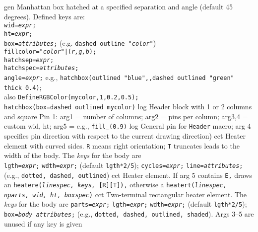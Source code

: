 %

%
  {gen}%
  {Manhattan box hatched at a specified separation
    and angle (default 45 degrees).
   Defined keys are:\\
    {\tt wid={\sl expr};}\\
    {\tt ht={\sl expr};}\\
    {\tt box={\sl attributes};} (e.g. {\tt dashed outline "{\sl color}"})\\
    {\tt fillcolor="{\sl color}"|({\sl r,g,b});}\\
    {\tt hatchsep={\sl expr};}\\
    {\tt hatchspec={\sl attributes};}\\
    {\tt angle={\sl expr};}
 e.g.,
   {\tt hatchbox(outlined "blue",{},dashed outlined "green" thick 0.4)};\\
   also
   {\tt DefineRGBColor(mycolor,1,0.2,0.5);\\
        hatchbox(box=dashed outlined mycolor)}}%
%
  {log}%
  {Header block with 1 or 2 columns and square Pin 1:
   arg1 = number of columns;
   arg2 = pins per column;
   arg3,4 = custom wid, ht;
   arg5 = e.g., {\tt fill\_(0.9)}%
    }%
%
  {log}%
  {General pin for {\tt Header} macro; arg 4 specifies pin direction
   with respect to the current drawing direction)}%
%
  {cct}%
  {Heater element with curved sides.
    {\tt R} means right orientation;
    {\tt T} truncates leads to the width of the body.
    The {\sl keys} for the body are\\
    {\tt lgth={\sl expr};}
    {\tt wdth={\sl expr};} (default {\tt lgth*2/5});
    {\tt cycles={\sl expr};}%
    {\tt line={\sl attributes};} (e.g., {\tt dotted, dashed, outlined})}%
%
  {cct}%
  {Heater element. If arg 5 contains {\tt E,}
    draws an {\tt heatere({\sl linespec, keys,} [R][T]),}
    otherwise a
    {\tt heatert({\sl linespec, nparts, wid, ht, boxspec})}}%
%
  {cct}%
  {Two-terminal rectangular heater element.
    The {\sl keys} for the body are
    {\tt parts={\sl expr};}
    {\tt lgth={\sl expr};}
    {\tt wdth={\sl expr};} (default {\tt lgth*2/5});
    {\tt box={\sl body attributes};}
      (e.g., {\tt dotted, dashed, outlined, shaded}).
    Args 3--5 are unused if any key is given}%
